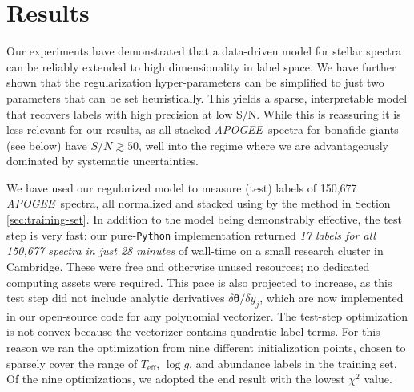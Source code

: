 \documentclass[12pt,preprint]{aastex}
\newcommand{\project}[1]{\textsl{#1}}
\newcommand{\acronym}[1]{{\small{#1}}}
\newcommand{\apogee}{\project{\acronym{APOGEE}}}
\newcommand{\logg}{\log g}
\newcommand{\Teff}{T_{\mathrm{eff}}}
\newcommand{\Dvector}[1]{\boldsymbol{#1}}
\newcommand{\vectheta}{\Dvector{\theta}}
\begin{document}


\section{Results}
\label{sec:results}


Our experiments have demonstrated that a data-driven model for stellar spectra
can be reliably extended to high dimensionality in label space.  We have further
shown that the regularization hyper-parameters can be simplified to just two
parameters that can be set heuristically.  This yields a sparse, interpretable 
model that recovers labels with high precision at low S/N.  While this is 
reassuring it is less relevant for our results, as all stacked \apogee\
spectra for bonafide giants (see below) have $S/N \gtrsim 50$, well into the 
regime where we are advantageously dominated by systematic uncertainties.


We have used our regularized model to measure (test) labels of 150,677 \apogee\ 
spectra, all normalized and stacked using by the method in Section 
\ref{sec:training-set}.  In addition to the model being demonstrably effective,
the test step is very fast: our pure-\texttt{Python} implementation returned 
\emph{17 labels for all 150,677 spectra in just 28 minutes} of wall-time 
on a small research cluster in Cambridge.  These were free 
and otherwise unused resources; no dedicated computing assets were required.  
This pace is also projected to increase, as this test step did not include 
analytic derivatives $\delta\vectheta/\delta{}y_j$, which are now implemented
in our open-source code for any polynomial vectorizer.  The test-step 
optimization is not convex because the vectorizer contains
quadratic label terms.  For this reason we ran the optimization from nine
different initialization points, chosen to sparsely cover the range of
$\Teff$, $\logg$, and abundance labels in the training set.  Of the nine
optimizations, we adopted the end result with the lowest $\chi^2$ value.
\end{document}
